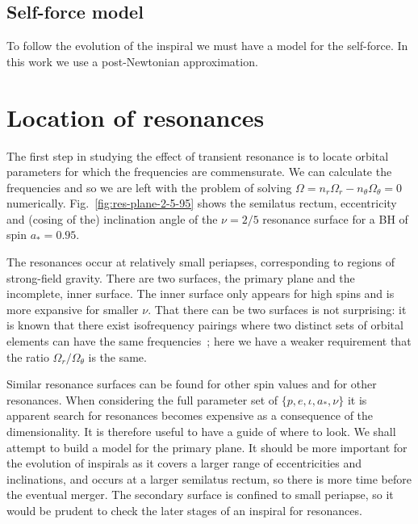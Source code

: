 \documentclass[aps,prd,amsfonts,amssymb,amsmath,nofootinbib,reprint,showpacs]{revtex4-1}
\newcommand{\Figref}[1]{Fig.\ \ref{fig:#1}}
\begin{document}
\subsection{Self-force model}

To follow the evolution of the inspiral we must have a model for the self-force. In this work we use a post-Newtonian approximation.


\section{Location of resonances}

The first step in studying the effect of transient resonance is to locate orbital parameters for which the frequencies are commensurate. We can calculate the frequencies and so we are left with the problem of solving $\Omega = n_r \Omega_r - n_\theta \Omega_\theta = 0$ numerically. \Figref{res-plane-2-5-95} shows the semilatus rectum, eccentricity and (cosing of the) inclination angle of the $\nu = 2/5$ resonance surface for a BH of spin $a_\ast = 0.95$.
\begin{figure*}[htbp]
\centering
\caption{\label{fig:res-plane-2-5-95}Location of the $2/5$ resonance surface for a $a_\ast = 0.95$ BH in terms of orbital semilatus rectum $p$, eccentricity $e$ and inclination $\iota$.}
\end{figure*}
The resonances occur at relatively small periapses, corresponding to regions of strong-field gravity. There are two surfaces, the primary plane and the incomplete, inner surface. The inner surface only appears for high spins and is more expansive for smaller $\nu$. That there can be two surfaces is not surprising: it is known that there exist isofrequency pairings where two distinct sets of orbital elements can have the same frequencies~\cite{Warburton2011}; here we have a weaker requirement that the ratio $\Omega_r/\Omega_\theta$ is the same.

Similar resonance surfaces can be found for other spin values and for other resonances. When considering the full parameter set of $\{p,e,\iota,a_\ast,\nu\}$ it is apparent search for resonances becomes expensive as a consequence of the dimensionality. It is therefore useful to have a guide of where to look. We shall attempt to build a model for the primary plane. It should be more important for the evolution of inspirals as it covers a larger range of eccentricities and inclinations, and occurs at a larger semilatus rectum, so there is more time before the eventual merger. The secondary surface is confined to small periapse, so it would be prudent to check the later stages of an inspiral for resonances.
\end{document}
